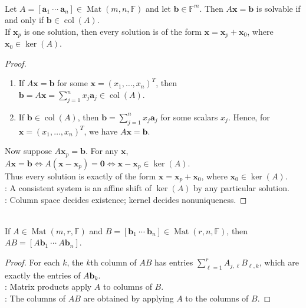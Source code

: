 \begin{proposition} \label{prop:linear-system-solvability-and-affine-solution-set} \\
Let $A=[\mathbf{a}_1\ \cdots\ \mathbf{a}_n]\in\operatorname{Mat}(m,n,\mathbb{F})$ and let $\mathbf{b}\in\mathbb{F}^m$. Then $A\mathbf{x}=\mathbf{b}$ is solvable if and only if $\mathbf{b}\in\operatorname{col}(A)$.\\
If $\mathbf{x}_p$ is one solution, then every solution is of the form $\mathbf{x}=\mathbf{x}_p+\mathbf{x}_0$, where $\mathbf{x}_0\in\ker(A)$.
\begin{proof}
\begin{enumerate}[label=\roman*.]
\setlength{\itemsep}{0pt}
\item[$(\Rightarrow)$] If $A\mathbf{x}=\mathbf{b}$ for some $\mathbf{x}=(x_1,\ldots,x_n)^T$, then $\mathbf{b}=A\mathbf{x}=\sum\limits_{j=1}^n x_j\mathbf{a}_j\in\operatorname{col}(A)$.
\item[$(\Leftarrow)$] If $\mathbf{b}\in\operatorname{col}(A)$, then $\mathbf{b}=\sum_{j=1}^n x_j\mathbf{a}_j$ for some scalars $x_j$. Hence, for $\mathbf{x}=(x_1,\ldots,x_n)^T$, we have $A\mathbf{x}=\mathbf{b}$.
\end{enumerate}
Now suppose $A\mathbf{x}_p=\mathbf{b}$. For any $\mathbf{x}$, $A\mathbf{x}=\mathbf{b}\iff A(\mathbf{x}-\mathbf{x}_p)=\mathbf{0}\iff \mathbf{x}-\mathbf{x}_p\in\ker(A)$.\\
Thus every solution is exactly of the form $\mathbf{x}=\mathbf{x}_p+\mathbf{x}_0$, where $\mathbf{x}_0\in\ker(A)$.\\
: A consistent system is an affine shift of $\ker(A)$ by any particular solution.\\
: Column space decides existence; kernel decides nonuniqueness.
\end{proof}
\end{proposition}

\begin{proposition} \label{prop:matrix-product-by-columns} \\
If $A\in\operatorname{Mat}(m,r,\mathbb{F})$ and $B=[\mathbf{b}_1\ \cdots\ \mathbf{b}_n]\in\operatorname{Mat}(r,n,\mathbb{F})$, then $AB=[A\mathbf{b}_1\ \cdots\ A\mathbf{b}_n]$.
\begin{proof}
For each $k$, the $k$th column of $AB$ has entries $\sum_{\ell=1}^r A_{j,\ell}B_{\ell,k}$, which are exactly the entries of $A\mathbf{b}_k$.\\
: Matrix products apply $A$ to columns of $B$.\\
: The columns of $AB$ are obtained by applying $A$ to the columns of $B$.
\end{proof}
\end{proposition}

